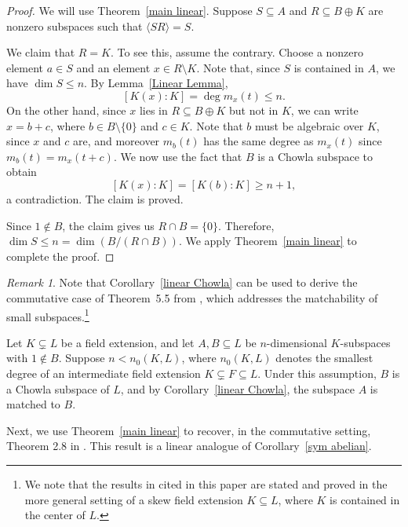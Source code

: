\documentclass[11pt]{amsart}
\theoremstyle{definition}
\theoremstyle{remark}
\newtheorem{remark}[theorem]{Remark}
\begin{document}
\begin{proof}
We will use Theorem~\ref{main linear}. Suppose \( S \subseteq A \) and \( R \subseteq B \oplus K \) are nonzero subspaces such that \( \langle SR \rangle = S \). 

\medskip

We claim that \( R = K \).  To see this, assume the contrary. Choose a nonzero element \( a \in S \) and an element \( x \in R \setminus K \). Note that, since \( S \) is contained in \( A \), we have \( \dim S \leq n \). By Lemma~\ref{Linear Lemma}, 
\[ [K(x):K] = \deg m_x(t) \leq n. 
\] 
On the other hand, since \( x \) lies in \( R \subseteq B \oplus K \) but not in \( K \), we can write \( x = b + c \), where \( b \in B \setminus \{ 0 \} \) and \( c \in K \). Note that \( b \) must be algebraic over \( K \), since \( x \) and \( c \) are, and moreover \( m_b(t) \) has the same degree as \( m_x(t) \) since \( m_b(t) = m_x(t + c) \).  We now use the fact that \( B \) is a Chowla subspace to obtain
\[
[K(x) : K ] = [K(b) : K ] \geq n + 1,
\]
a contradiction.  The claim is proved.

\medskip

Since \( 1 \notin B \), the claim gives us \( R \cap B = \{ 0 \} \).  Therefore, \( \dim S \leq n = \dim (B / (R \cap B)) \). We apply Theorem~\ref{main linear} to complete the proof.
\end{proof}


\begin{remark}
   Note that Corollary~\ref{linear Chowla} can be used to derive the commutative case of Theorem~5.5 from \cite{Eliahou 2}, which addresses the matchability of small subspaces.\footnote {We note that the results in \cite{Eliahou 2} cited in this paper are stated and proved in the more general setting of a skew field extension \( K \subseteq L \), where \( K \) is contained in the center of \( L \).}

Let \( K \subsetneq L \) be a field extension, and let \( A, B \subseteq L \) be \( n \)-dimensional \( K \)-subspaces with \( 1 \notin B \). Suppose \( n < n_0(K, L) \), where \( n_0(K, L) \) denotes the smallest degree of an intermediate field extension \( K \subsetneq F \subseteq L \). Under this assumption, \( B \) is a Chowla subspace of \( L \), and by Corollary~\ref{linear Chowla}, the subspace \( A \) is matched to \( B \).
\end{remark}


Next, we use Theorem~\ref{main linear} to recover, in the commutative setting, Theorem 2.8 in \cite{Eliahou 2}. This result is a linear analogue of Corollary~\ref{sym abelian}.
\end{document}
